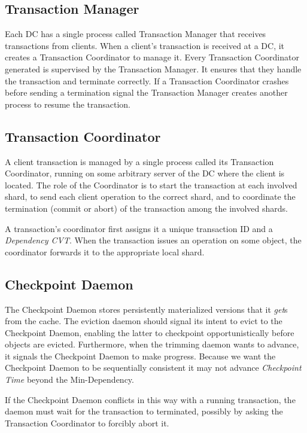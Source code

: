\documentclass[11pt]{article}
\begin{document}
\subsection{Transaction Manager}
\label{sec:transaction-daemon}

Each DC has a single process called Transaction Manager that receives
transactions from clients.
When a client's transaction is received at a DC, it creates a Transaction
Coordinator to manage it.
Every Transaction Coordinator generated is supervised by the Transaction
Manager. 
It ensures that they handle the transaction and terminate correctly.
If a Transaction Coordinator crashes before sending a termination signal the
Transaction Manager creates another process to resume the transaction.


\subsection{Transaction Coordinator}
\label{sec:transaction-coordinator}
            
A client transaction is managed by a single process called its
Transaction Coordinator, running on some arbitrary server of the DC
where the client is located.
The role of the Coordinator is to start the transaction at each involved
shard, to send each client operation to the correct shard, and to
coordinate the termination (commit or abort) of the transaction among
the involved shards.

A transaction's coordinator first assigns it a unique transaction ID and
a \emph{Dependency CVT}.
When the transaction issues an operation on some object, the coordinator
forwards it to the appropriate local shard.

\subsection{Checkpoint Daemon}
\label{sec:checkpoint-daemon}

The Checkpoint Daemon stores persistently materialized versions that it
\emph{get}s from the cache.
The eviction daemon should signal its intent to evict to the
Checkpoint Daemon, enabling the latter to checkpoint 
opportunistically before objects are evicted.
Furthermore, when the trimming daemon wants to advance, it signals the
Checkpoint Daemon to make progress.
Because we want the Checkpoint Daemon to be sequentially consistent
it may not advance \emph{Checkpoint Time} beyond the Min-Dependency.

If the Checkpoint Daemon conflicts in this way with a running
transaction, the daemon must wait for the transaction to terminated,
possibly by asking the Transaction Coordinator to forcibly abort it.
\end{document}

